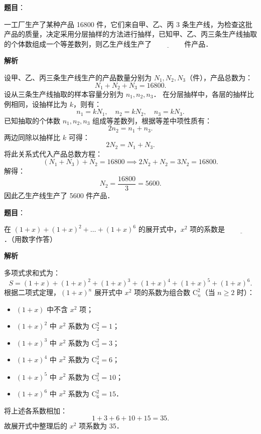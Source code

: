 \begin{answer}

\textbf{题目}：

一工厂生产了某种产品 16800 件，它们来自甲、乙、丙 3 条生产线，为检查这批产品的质量，决定采用分层抽样的方法进行抽样，已知甲、乙、丙三条生产线抽取的个体数组成一个等差数列，则乙生产线生产了 $\underline{\qquad\qquad}$ 件产品．

\textbf{解析}

设甲、乙、丙三条生产线生产的产品数量分别为 $N_1, N_2, N_3$（件），产品总数为：
\nopagebreak[4]
\[
N_1 + N_2 + N_3 = 16800.
\]
设从三条生产线抽取的样本容量分别为 $n_1, n_2, n_3$．
在分层抽样中，各层的抽样比例相同，设抽样比为 $k$，则有：
\nopagebreak[4]
\[
n_1 = k N_1, \quad n_2 = k N_2, \quad n_3 = k N_3.
\]
已知抽取的个体数 $n_1, n_2, n_3$ 组成等差数列，根据等差中项性质有：
\nopagebreak[4]
\[
2n_2 = n_1 + n_3.
\]
两边同除以抽样比 $k$ 可得：
\nopagebreak[4]
\[
2N_2 = N_1 + N_3.
\]
将此关系式代入产品总数方程：
\nopagebreak[4]
\[
(N_1 + N_3) + N_2 = 16800 \implies 2N_2 + N_2 = 3N_2 = 16800.
\]
解得：
\nopagebreak[4]
\[
N_2 = \frac{16800}{3} = 5600.
\]
因此乙生产线生产了 5600 件产品．


\end{answer}
\begin{answer}

\textbf{题目}：

在 $(1 + x) + (1 + x)^2 + \dots + (1 + x)^6$ 的展开式中，$x^2$ 项的系数是 $\underline{\qquad\qquad}$．（用数字作答）

\textbf{解析}

多项式求和式为：
\nopagebreak[4]
\[
S = (1 + x) + (1 + x)^2 + (1 + x)^3 + (1 + x)^4 + (1 + x)^5 + (1 + x)^6.
\]
根据二项式定理，$(1 + x)^n$ 展开式中 $x^2$ 项的系数为组合数 $\mathrm{C}_n^2$（当 $n \geqslant 2$ 时）：
\begin{itemize}
\item $(1 + x)$ 中不含 $x^2$ 项；
\item $(1 + x)^2$ 中 $x^2$ 系数为 $\mathrm{C}_2^2 = 1$；
\item $(1 + x)^3$ 中 $x^2$ 系数为 $\mathrm{C}_3^2 = 3$；
\item $(1 + x)^4$ 中 $x^2$ 系数为 $\mathrm{C}_4^2 = 6$；
\item $(1 + x)^5$ 中 $x^2$ 系数为 $\mathrm{C}_5^2 = 10$；
\item $(1 + x)^6$ 中 $x^2$ 系数为 $\mathrm{C}_6^2 = 15$．
\end{itemize}

将上述各系数相加：
\nopagebreak[4]
\[
1 + 3 + 6 + 10 + 15 = 35.
\]
故展开式中整理后的 $x^2$ 项系数为 35．


\end{answer}
